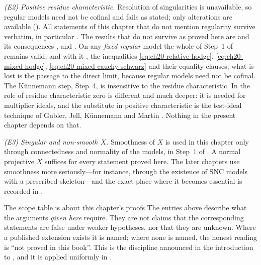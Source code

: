 \emph{(E2) Positive residue characteristic.}  Resolution of singularities is
unavailable, so regular models need not be cofinal and
 fails as stated; only alterations are available
().  All statements of this chapter that do
not mention regularity survive verbatim, in particular
.
The results that do not survive as proved here are
 and its consequences
,  and
.  On any \emph{fixed regular}
model the whole of Step~1 of  remains valid, and
with it , the inequalities
\eqref{eq:ch20-relative-hodge}, \eqref{eq:ch20-mixed-hodge},
\eqref{eq:ch20-mixed-cauchy-schwarz} and their equality clauses; what is
lost is the passage to the direct limit, because regular models need not be
cofinal.  The Künnemann step, Step~4, is insensitive to the residue
characteristic.  In
 the role of residue
characteristic zero is different and much deeper: it is needed for
multiplier ideals, and the substitute in positive characteristic is the
test-ideal technique of Gubler, Jell, K\"unnemann and Martin
\cite{GJKM19}.  Nothing in the present chapter depends on that.

\emph{(E3) Singular and non-smooth \(X\).}  Smoothness of \(X\) is used in
this chapter only through connectedness and normality of the models, in
Step~1 of .  A normal projective \(X\) suffices
for every statement proved here.  The later chapters use smoothness more
seriously---for instance, through the existence of SNC models with a
prescribed skeleton---and the exact place where it becomes essential is
recorded in .

\begin{warning}{The scope table is about this chapter's proofs}
The entries above describe what the arguments \emph{given here} require.
They are not claims that the corresponding statements are false under weaker
hypotheses, nor that they are unknown.  Where a published extension exists
it is named; where none is named, the honest reading is ``not proved in this
book''.  This is the discipline announced in the introduction to
, and it is applied uniformly in
.
\end{warning}

